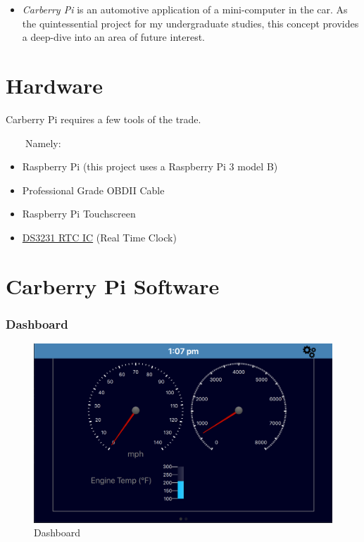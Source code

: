 \documentclass{article}
\providecommand{\tightlist}{%
  \setlength{\itemsep}{0pt}\setlength{\parskip}{0pt}}
\begin{document}
\begin{itemize}
\tightlist
\item
  \emph{Carberry Pi} is an automotive application of a mini-computer in
  the car. As the quintessential project for my undergraduate studies,
  this concept provides a deep-dive into an area of future interest.
\end{itemize}

\hypertarget{hardware}{%
\section{Hardware}\label{hardware}}

Carberry Pi requires a few tools of the trade.

~~~~Namely:

\begin{itemize}
\item
  Raspberry Pi (this project uses a Raspberry Pi 3 model B)
\item
  Professional Grade OBDII Cable
\item
  Raspberry Pi Touchscreen
\item
 \href{https://thepihut.com/products/mini-rtc-module-for-raspberry-pi}{DS3231 RTC IC}
  (Real Time Clock)
\end{itemize}

\hypertarget{carberry-pi-software}{%
\section{Carberry Pi Software}\label{carberry-pi-software}}

\hypertarget{dashboard}{%
\subsubsection{Dashboard}\label{dashboard}}

\begin{figure}
\centering
\includegraphics{./resources/dash.png}
\caption{Dashboard}
\end{figure}
\end{document}
